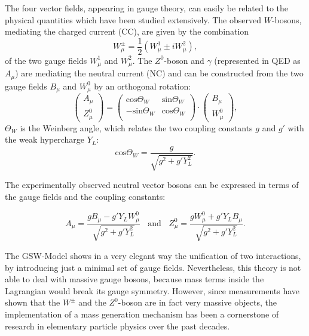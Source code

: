 The four vector fields, appearing in gauge theory, can easily be related to the physical quantities which have been studied extensively. 
The observed $W$-bosons, mediating the charged current (CC), are given by the combination
\begin{equation}\label{EWtrafo1}
 W^{\pm}_\mu = \frac{1}{2}(W^{1}_\mu\pm iW^{2}_\mu),
\end{equation}
of the two gauge fields $W^{1}_\mu$ and $W^{2}_\mu$. The $Z^0$-boson and $\gamma$ (represented in QED as $A_\mu$) are mediating the neutral current (NC) and can be constructed from the two gauge fields $B_{\mu}$ and $W_{\mu}^{0}$ by an orthogonal rotation:
\begin{equation}\label{EWtrafo2}
\begin{pmatrix}
A_\mu\\
Z^0_\mu
\end{pmatrix}
=
\begin{pmatrix}
\text{cos}\Theta_W & \text{sin}\Theta_ W \\
-\text{sin}\Theta_W & \text{cos}\Theta_W  \\

\end{pmatrix}
\cdot 
\begin{pmatrix}
B_\mu\\
W^0_\mu
\end{pmatrix},
\end{equation}
 $\Theta_W$ is the Weinberg angle, which relates the two coupling constants $g$ and $g'$ with the weak hypercharge $Y_L$:
\begin{equation}\label{Weinber2}
\text{cos} \Theta_W = \frac{g}{\sqrt{g^2+g'Y^2_L}}.
\end{equation} 

The experimentally observed neutral vector bosons can be expressed in terms of the gauge fields and the coupling constants: 

\begin{equation}
A_\mu = \frac{gB_\mu -g'Y_LW_\mu^0}{\sqrt{g^2+g'Y^2_L}} ~~~~\mathrm{and} ~~~~Z_\mu^0 = \frac{gW_\mu^0 +g'Y_LB_\mu}{\sqrt{g^2+g'Y^2_L}}.
\end{equation}

The GSW-Model shows in a very elegant way the unification of two interactions, by introducing just a minimal set of gauge fields. Nevertheless, this theory is not able to deal with massive gauge bosons, because mass terms inside the Lagrangian would break its gauge symmetry. However, since measurements have shown that the $W^\pm$ and the $Z^0$-boson are in fact very massive objects, the implementation of a mass generation mechanism has been a cornerstone of research in elementary particle physics over the past decades.

